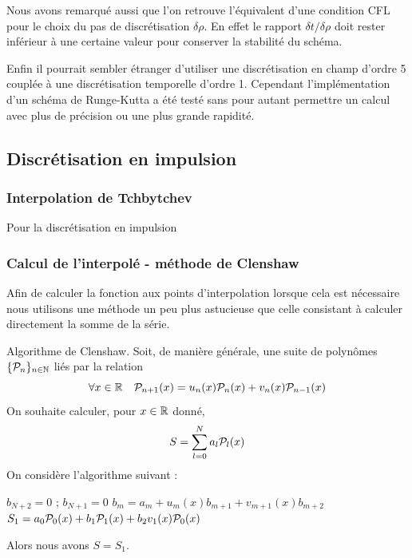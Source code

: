 \documentclass[10pt]{article}
\begin{document}
\begin{multicols}{2}
Nous avons remarqué aussi que l'on retrouve l'équivalent d'une condition CFL pour le choix du pas de discrétisation $\delta \rho$. En effet le rapport $\delta t / \delta\rho$ doit rester inférieur à une certaine valeur pour conserver la stabilité du schéma.

Enfin il pourrait sembler étranger d'utiliser une discrétisation en champ d'ordre 5 couplée à une discrétisation temporelle d'ordre 1. Cependant l'implémentation d'un schéma de Runge-Kutta a été testé sans pour autant permettre un calcul avec plus de précision ou une plus grande rapidité. 

\subsection{Discrétisation en impulsion}
\subsubsection{Interpolation de Tchbytchev}

Pour la discrétisation en impulsion 


\subsubsection{Calcul de l'interpolé - méthode de Clenshaw}


Afin de calculer la fonction aux points d'interpolation lorsque cela est nécessaire nous utilisons une méthode un peu plus astucieuse que celle consistant à calculer directement la somme de la série.

\begin{proposition}{Algorithme de Clenshaw}.
Soit, de manière générale, une suite de polynômes $\{\mathcal{P}_n\}_{n \in \mathbb{N}}$ liés par la relation
\begin{equation}
  \forall x \in \mathbb{R} \quad \mathcal{P}_{n+1}(x) = u_n(x)\mathcal{P}_n(x) + v_n(x)\mathcal{P}_{n-1}(x)
\end{equation}
On souhaite calculer, pour $x \in \mathbb{R}$ donné, 
\begin{equation}
  S = \sum_{l=0}^{N} a_l \mathcal{P}_l(x)
\end{equation}
On considère l'algorithme suivant :
\vspace*{-11pt}
\begin{algorithm}[H]
  \begin{algorithmic}[1]
    \STATE $b_{N+2} = 0$ ; $b_{N+1} = 0$
    \STATE $b_m = a_m + u_m(x)b_{m+1} + v_{m+1}(x)b_{m+2}$
    \ENDFOR
    \STATE $S_1 = a_0\mathcal{P}_0(x) + b_1\mathcal{P}_1(x) + b_2v_1(x)\mathcal{P}_0(x)$
  \end{algorithmic}
\end{algorithm}
\vspace*{-11pt}
\noindent
Alors nous avons $S = S_1$. 
\end{proposition}


\end{multicols}
\end{document}
